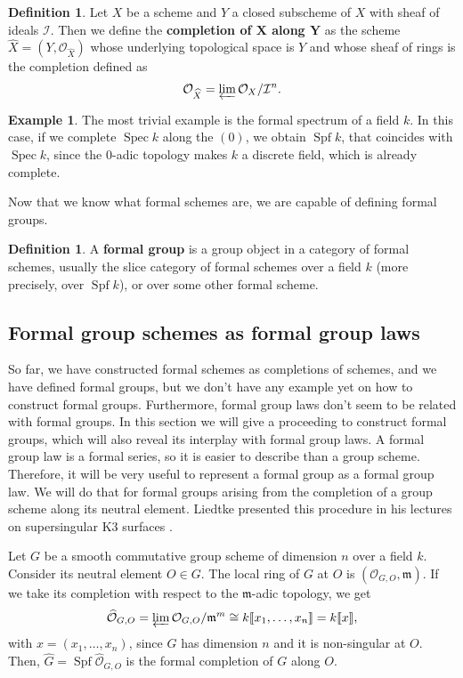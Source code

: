 \documentclass{report}
\DeclareMathOperator{\Spf}{Spf}
\DeclareMathOperator{\Spec}{Spec}
\theoremstyle{definition}
\newtheorem{definition}[theorem]{Definition}
\newtheorem{example}[theorem]{Example}
\begin{document}
\begin{definition}
Let $X$ be a scheme and $Y$ a closed subscheme of $X$ with sheaf of ideals $\mathcal{I}$. Then we define the \textbf{completion of $\boldsymbol{X}$ along $\boldsymbol{Y}$} as the scheme $\widehat{X}=(Y,\mathcal{O}_{\widehat{X}})$ whose underlying topological space is $Y$ and whose sheaf of rings is the completion defined as
\[\mathcal{O}_{\widehat{X}}=\varprojlim\mathcal{O}_X/\mathcal{I}^n.\]
\end{definition}

\begin{example}
The most trivial example is the formal spectrum of a field $k$. In this case, if we complete $\Spec k$ along the $(0)$, we obtain $\Spf k$, that coincides with $\Spec k$, since the $0$-adic topology makes $k$ a discrete field, which is already complete.
\end{example}

Now that we know what formal schemes are, we are capable of defining formal groups.

\begin{definition}
A \textbf{formal group} is a group object in a category of formal schemes, usually the slice category of formal schemes over a field $k$ (more precisely, over $\Spf k$), or over some other formal scheme.
\end{definition}

\subsection{Formal group schemes as formal group laws}

So far, we have constructed formal schemes as completions of schemes, and we have defined formal groups, but we don't have any example yet on how to construct formal groups. Furthermore, formal group laws don't seem to be related with formal groups. In this section we will give a proceeding to construct formal groups, which will also reveal its interplay with formal group laws. A formal group law is a formal series, so it is easier to describe than a group scheme. Therefore, it will be very useful to represent a formal group as a formal group law. We will do that for formal groups arising from the completion of a group scheme along its neutral element. Liedtke presented this procedure in his lectures on supersingular K3 surfaces \cite[Example~6.10]{liedtke2016lectures}.

Let $G$ be a smooth commutative group scheme of dimension $n$ over a field $k$. Consider its neutral element $O\in G$. The local ring of $G$ at $O$ is $(\mathcal{O}_{G,O},\mathfrak{m})$. If we take its completion with respect to the $\mathfrak{m}$-adic topology, we get
\[\widehat{\mathcal{O}}_{G,O}=\varprojlim\mathcal{O}_{G,O}/\mathfrak{m}^m\cong k\llbracket x_1,\ldots,x_n\rrbracket=k\llbracket x\rrbracket,\]
with $x=(x_1,\ldots,x_n)$, since $G$ has dimension $n$ and it is non-singular at $O$. Then, $\widehat{G}=\Spf\widehat{\mathcal{O}}_{G,O}$ is the formal completion of $G$ along $O$.
\end{document}
